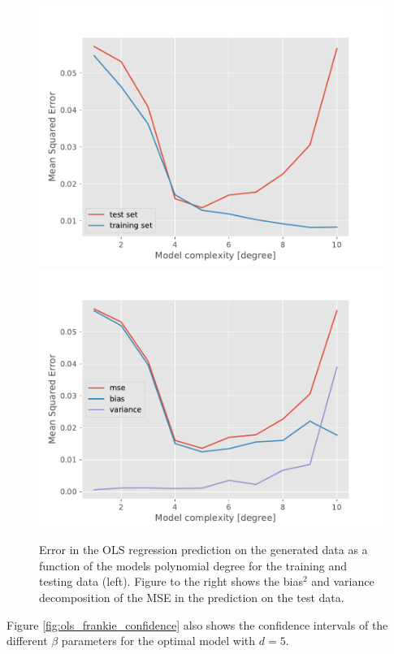 \begin{figure}[!h]
    \centering
    \includegraphics[scale=0.48]{Figures/OLS/deg_analysis_ols_test_train_001.pdf}
    \includegraphics[scale=0.48]{Figures/OLS/deg_analysis_ols_bias_variance_002.pdf}
    \caption{Error in the OLS regression prediction on the generated data as a function of the models polynomial degree for the training and testing data (left). Figure to the right shows the bias$^2$ and variance decomposition of the MSE in the prediction on the test data.}
    \label{fig:ols_frankie_train_test_bias_variance}
\end{figure}
Figure \ref{fig:ols_frankie_confidence} also shows the confidence intervals of the different $\beta$ parameters for the optimal model with $d=5$.

